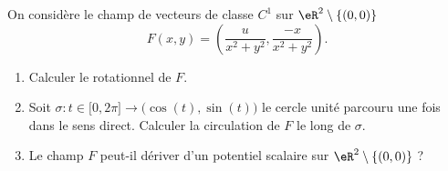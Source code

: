 
\begin{exercice}\label{exoOutilsMath-0096}

    On considère le champ de vecteurs de classe $C^1$ sur $\eR^2\setminus\{ (0,0) \}$
    \begin{equation}
        F(x,y)=\left( \frac{ u }{ x^2+y^2 },\frac{ -x }{ x^2+y^2 } \right).
    \end{equation}
    \begin{enumerate}
        \item
            Calculer le rotationnel de $F$.
        \item
            Soit $\sigma\colon t\in\mathopen[ 0 , 2\pi \mathclose]\to \big( \cos(t),\sin(t) \big)$ le cercle unité parcouru une fois dans le sens direct. Calculer la circulation de $F$ le long de $\sigma$.
        \item
            Le champ $F$ peut-il dériver d'un potentiel scalaire sur $\eR^2\setminus\{ (0,0) \}$ ?
    \end{enumerate}
    
\end{exercice}
